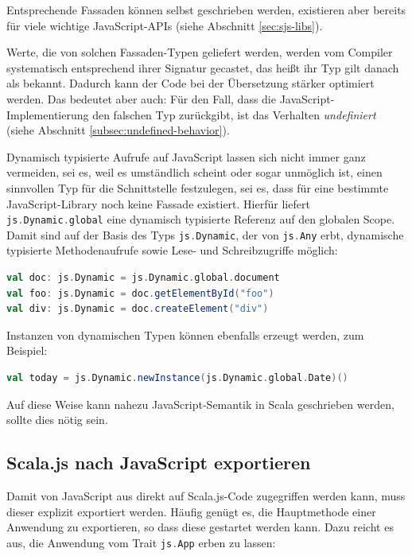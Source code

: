 \documentclass[a4paper, 12pt, hidelinks, listof=totoc, listoftables=totoc, bibliography=totoc]{scrreprt}
\newcommand{\scala}[1]{\lstinline[language=Scala, style=inline]|#1|}
\begin{document}
Entsprechende Fassaden können selbst geschrieben werden, existieren aber bereits für viele wichtige JavaScript-\ac{API}s (siehe Abschnitt \ref{sec:sjs-libs}).

Werte, die von solchen Fassaden-Typen geliefert werden, werden vom Compiler systematisch entsprechend ihrer Signatur gecastet, das heißt ihr Typ gilt danach als bekannt. Dadurch kann der Code bei der Übersetzung stärker optimiert werden. Das bedeutet aber auch: Für den Fall, dass die JavaScript-Implementierung den falschen Typ zurückgibt, ist das Verhalten \emph{undefiniert} (siehe Abschnitt \ref{subsec:undefined-behavior}). \cite[Folie 40, Min. 33]{doeraene2015.SSP}

Dynamisch typisierte Aufrufe auf JavaScript lassen sich nicht immer ganz vermeiden, sei es, weil es umständlich scheint oder sogar unmöglich ist, einen sinnvollen Typ für die Schnittstelle festzulegen, sei es, dass für eine bestimmte JavaScript-Library noch keine Fassade existiert. Hierfür liefert \scala{js.Dynamic.global} eine dynamisch typisierte Referenz auf den globalen Scope. Damit sind auf der Basis des Typs \scala{js.Dynamic}, der von \scala{js.Any} erbt, dynamische typisierte Methodenaufrufe sowie Lese- und Schreibzugriffe möglich:

\begin{lstlisting}[language=Scala, style=snippet]
val doc: js.Dynamic = js.Dynamic.global.document
val foo: js.Dynamic = doc.getElementById("foo")
val div: js.Dynamic = doc.createElement("div")
\end{lstlisting}

Instanzen von dynamischen Typen können ebenfalls erzeugt werden, zum Beispiel:

\begin{lstlisting}[language=Scala, style=snippet]
val today = js.Dynamic.newInstance(js.Dynamic.global.Date)()
\end{lstlisting}

Auf diese Weise kann nahezu JavaScript-Semantik in Scala geschrieben werden, sollte dies nötig sein. \cite{scalajs.DCJ}

\subsection{Scala.js nach JavaScript exportieren}

Damit von JavaScript aus direkt auf Scala.js-Code zugegriffen werden kann, muss dieser explizit exportiert werden. Häufig genügt es, die Hauptmethode einer Anwendung zu exportieren, so dass diese gestartet werden kann. Dazu reicht es aus, die Anwendung vom Trait \scala{js.App} erben zu lassen:
\end{document}
